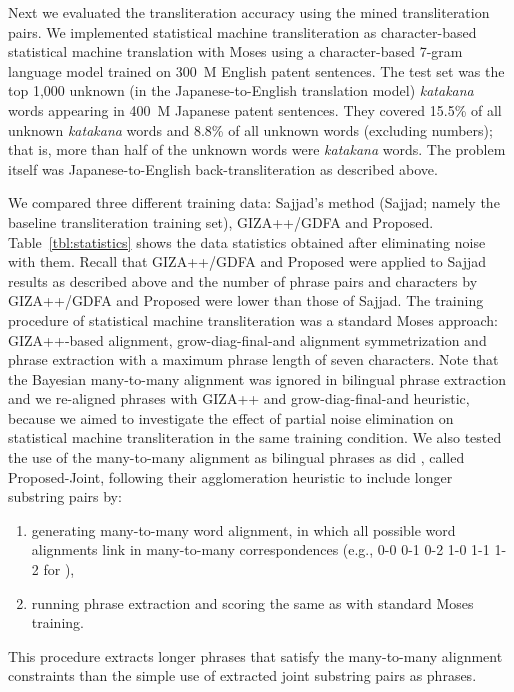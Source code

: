 \documentclass[english]{jnlp_1.4}
\def\subpair#1#2{}
\begin{document}
Next we evaluated the transliteration accuracy using the mined transliteration pairs.
We implemented statistical machine transliteration as
character-based statistical machine translation with Moses
using a character-based 7-gram language model trained on 300~M English patent sentences.
The test set was the top 1,000 unknown (in the Japanese-to-English translation model) {\it katakana} words
appearing in 400~M Japanese patent sentences.
They covered 15.5\% of all unknown {\it katakana} words and 8.8\% of all unknown words (excluding numbers);
that is, more than half of the unknown words were {\it katakana} words.
The problem itself was Japanese-to-English back-transliteration as described above.

\begin{table}[b]
\label{tbl:statistics}

\end{table}

We compared three different training data:
Sajjad's method ({\sc Sajjad}; namely the baseline transliteration training set), {\sc GIZA++/GDFA} and {\sc Proposed}.
Table~\ref{tbl:statistics} shows the data statistics obtained after eliminating noise with them.
Recall that {\sc GIZA++/GDFA} and {\sc Proposed} were applied to {\sc Sajjad} results as described above
and the number of phrase pairs and characters by {\sc GIZA++/GDFA} and {\sc Proposed} were lower than those of {\sc Sajjad}.
The training procedure of statistical machine transliteration was a standard Moses approach:
GIZA++-based alignment, grow-diag-final-and alignment symmetrization
and phrase extraction with a maximum phrase length of seven characters.
Note that the Bayesian many-to-many alignment was ignored in bilingual phrase extraction
and we re-aligned phrases with GIZA++ and grow-diag-final-and heuristic,
because we aimed to investigate the effect of partial noise elimination on statistical machine transliteration
in the same training condition.
We also tested the use of the many-to-many alignment as bilingual phrases as did {\cite{finch:2010:iwslt}},
called {\sc Proposed-Joint},
following their agglomeration heuristic to include longer substring pairs by:
\begin{enumerate}
\item generating many-to-many word alignment, in which all possible word alignments link in many-to-many correspondences
      (e.g., 0-0 0-1 0-2 1-0 1-1 1-2 for {$\subpair{\text{コン}}{\mathrm{com}}$}),
\item running phrase extraction and scoring the same as with standard Moses training.
\end{enumerate}
This procedure extracts longer phrases that satisfy the many-to-many alignment constraints
than the simple use of extracted joint substring pairs as phrases.
\end{document}
